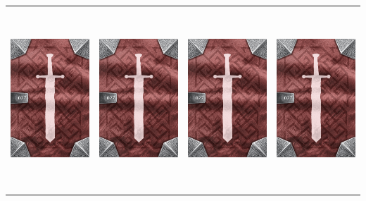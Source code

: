 \documentclass{minimal}
\begin{document}
{\begin{longtable}{llll}
\includegraphics[width=44mm,height=68mm]{./22-28/gh-027-major-healing-potion-back.png} &
\includegraphics[width=44mm,height=68mm]{./22-28/gh-027-major-healing-potion-back.png} &
\includegraphics[width=44mm,height=68mm]{./22-28/gh-027-major-healing-potion-back.png} &
\includegraphics[width=44mm,height=68mm]{./22-28/gh-027-major-healing-potion-back.png}\\ 

\end{longtable}}
\end{document}
